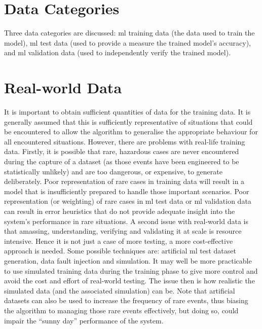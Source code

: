\section{Data Categories}
Three data categories are discussed: \gls{ml} training data (the data used to train the model),
\gls{ml} test data (used to provide a measure the trained model’s \gls{accuracy}), and \gls{ml}
validation data (used to independently verify the trained model).  

\section{Real-world Data}
It is important to obtain sufficient quantities of data for the training data. It is generally assumed that this is sufficiently representative of situations that could be encountered to allow the algorithm to generalise the appropriate behaviour for all encountered situations.  However, there are problems with real-life training data. Firstly, it is possible that rare, hazardous cases are never encountered during the capture of a \gls{dataset} (as those events have been engineered to be statistically unlikely) and are too dangerous, or expensive, to generate deliberately. Poor representation of rare cases in training data will result in a model that is insufficiently prepared to handle those important scenarios. Poor representation (or weighting) of rare cases in
\gls{ml} test data or \gls{ml}
validation data can result in error heuristics that do not provide adequate insight into the system’s performance in rare situations. A second issue with real-world data is that amassing, understanding, verifying and validating it at scale is resource intensive.
Hence it is not just a case of more testing, a more cost-effective approach is needed. Some possible techniques are: artificial
\gls{ml}
test \gls{dataset} generation, data fault injection and simulation. It may well be more practicable to use simulated training data during the training phase to give more control and avoid the cost and effort of real-world testing. The issue then is how realistic the simulated data (and the associated simulation) can be. Note that artificial \glspl{dataset} can also be used to increase the frequency of rare events, thus biasing the algorithm to managing those rare events effectively, but doing so, could impair the ``sunny day'' performance of the system.

